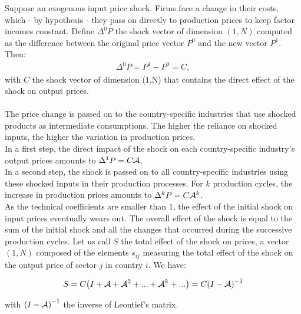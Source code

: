 \documentclass[11pt,a4paper]{article}
\begin{document}
Suppose an exogenous input price shock. Firms face a change in their costs, which - by hypothesis - they pass on directly to production prices to keep factor incomes constant.
Define ${{\Delta }^{0}}P$ the shock vector of dimension $(1, N)$ computed as the difference between the original price vector $P^0$ and the new  vector $P^1$. Then:
\begin{eqnarray*}
\Delta ^{0}P=P^1-P^0=C, 
\end{eqnarray*}
with $C$ the shock vector of dimension (1,N) that contains the direct effect of the shock on output prices.\\
\\
The price change is passed on to the country-specific industries that use shocked products as intermediate consumptions. The higher the reliance on shocked inputs, the higher the variation in production prices.\\
In a first step, the direct impact of the shock on each country-specific industry's output prices amounts to $\Delta^{1}P=C{\cal A}$.\\
In a second step, the shock is passed on to all country-specific industries using these shocked inputs in their production processes. For $k$ production cycles, the increase in production prices amounts to $\Delta^k P=C{\cal A}^k$.\\
As the technical coefficients are smaller than 1, the effect of the initial shock on input prices eventually wears out.
The overall effect of the shock is equal to the sum of the initial shock and all the changes that occurred during the successive production cycles.
Let us call $S$ the total effect of the shock on prices, a vector $(1, N)$ composed of the elements $s_{ij}$ measuring the total effect of the shock on the output price of sector $j$ in country $i$. We have: 

\begin{eqnarray}
S=C {\left( I+{\cal A}+{\cal A}^2+...+{\cal A}^k+...\right)} =C {\left( I-{\cal A} \right)}^{-1}
\label{eq:eqchocprix} 
\end{eqnarray}


with ${\left( I-{\cal A} \right)}^{-1}$ the inverse of Leontief's matrix.

\end{document}
